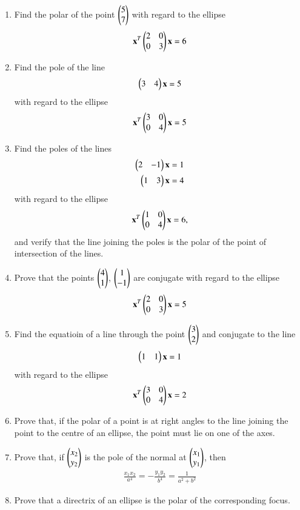 \renewcommand{\theequation}{\theenumi}
\begin{enumerate}[label=\arabic*.,ref=\thesubsection.\theenumi]
\item Find the polar of the point $\begin{pmatrix}5\\7\end{pmatrix}$ with regard to the ellipse
\begin{align}
\mathbf{x}^T\begin{pmatrix}2 & 0\\0 & 3\end{pmatrix}\mathbf{x} =6
\end{align}
\item Find the pole of the line 
\begin{align}
\begin{pmatrix}3 & 4\end{pmatrix}\mathbf{x}=5
\end{align}
with regard to the ellipse
\begin{align}
\mathbf{x}^T\begin{pmatrix}3 & 0\\0 & 4\end{pmatrix}\mathbf{x} =5
\end{align}
\item Find the poles of the lines 
\begin{align}
\begin{pmatrix}2 & -1\end{pmatrix}\mathbf{x}=1
\\
\begin{pmatrix}1 & 3\end{pmatrix}\mathbf{x}=4
\end{align}
with regard to the ellipse 
\begin{align}
\mathbf{x}^T\begin{pmatrix}1 & 0\\0 & 4\end{pmatrix}\mathbf{x} =6,
\end{align}
 and verify that the line joining
the poles is the polar of the point of intersection of the lines.
\item Prove that the points $\begin{pmatrix}4\\1\end{pmatrix}$, $\begin{pmatrix}1\\-1\end{pmatrix}$ are conjugate with regard to the ellipse
\begin{align}
\mathbf{x}^T\begin{pmatrix}2 & 0\\0 & 3\end{pmatrix}\mathbf{x} =5
\end{align}
\item Find the equatioin of a line through the point $\begin{pmatrix}3\\2\end{pmatrix}$ and conjugate to the
line 
\begin{align}
\begin{pmatrix}1 & 1\end{pmatrix}\mathbf{x}=1
\end{align}
with regard to the ellipse
\begin{align}
\mathbf{x}^T\begin{pmatrix}3 & 0\\0 & 4\end{pmatrix}\mathbf{x} =2
\end{align}
\item Prove that, if the polar of a point is at right angles to the line joining the point  to
the centre of an ellipse, the point must lie on one of the axes.
\item Prove that, if $\begin{pmatrix}x_2\\y_2\end{pmatrix}$ is the pole of the normal at $\begin{pmatrix}x_1\\y_1\end{pmatrix}$, then
\begin{align}
\frac{x_1x_2}{a^4}=-\frac{y_1y_2}{b^4}  = \frac{1}{a^2+b^2}
\end{align}
\item Prove that a directrix of an ellipse is the polar of the corresponding focus.
\end{enumerate}
